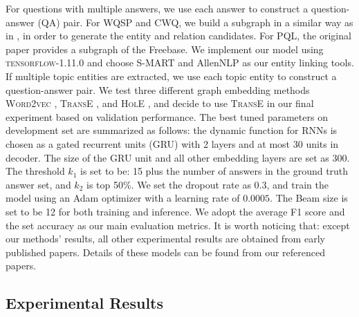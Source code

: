 For questions with multiple answers, we use each answer to construct a question-answer (QA) pair. For WQSP and CWQ, we build a subgraph in a similar way as in \cite{DBLP:conf/emnlp/SunDZMSC18}, in order to generate the entity and relation candidates. For PQL, the original paper provides a subgraph of the Freebase. We implement our model using \textsc{tensorflow-1.11.0} and choose S-MART \cite{DBLP:journals/corr/YangC16a} and AllenNLP \cite{Gardner2017AllenNLP} as our entity linking tools. %
If multiple topic entities are extracted, we use each topic entity to construct a question-answer pair. We test three different graph embedding methods \textsc{Word2vec} \cite{DBLP:journals/corr/abs-1301-3781}, \textsc{TransE} \cite{DBLP:conf/nips/BordesUGWY13}, and \textsc{HolE} \cite{DBLP:journals/corr/TrouillonN17}, and decide to use \textsc{TransE} in our final experiment based on validation performance. The best tuned parameters on development set are summarized as follows: the dynamic function for RNNs is chosen as a gated recurrent units (GRU) with 2 layers and at most 30 units in decoder. The size of the GRU unit and all other embedding layers are set as 300. The threshold $k_1$ is set to be: 15 plus the number of answers in the ground truth answer set, and $k_2$ is top 50\%. We set the dropout rate as 0.3, and train the model using an Adam optimizer with a learning rate of $0.0005$. The Beam size is set to be 12 for both training and inference. We adopt the average F1 score and the set accuracy as our main evaluation metrics. %
It is worth noticing that: except our methods' results, all other experimental results are obtained from early published papers. Details of these models can be found from our referenced papers.



\subsection{Experimental Results}



